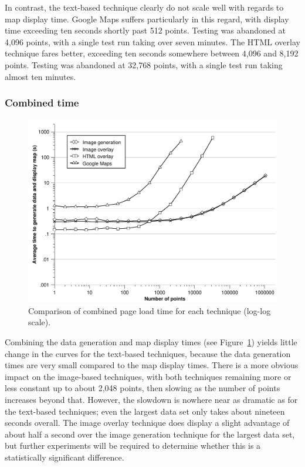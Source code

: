 \documentclass[acmnow]{acmtrans2m}
\begin{document}
In contrast, the text-based technique clearly do not scale well with
regards to map display time. Google Maps suffers particularly in this
regard, with display time exceeding ten seconds shortly past 512 points.
Testing was abandoned at 4,096 points, with a single test run taking
over seven minutes. The HTML overlay technique fares better, exceeding
ten seconds somewhere between 4,096 and 8,192 points. Testing was
abandoned at 32,768 points, with a single test run taking almost ten
minutes.


\subsubsection{Combined time}


\begin{figure}
	\centering
	\includegraphics[scale=0.5]{combined_time}
	\caption{Comparison of combined page load time for each technique (log-log scale).}
	\label{fig-combined-time}
\end{figure}


Combining the data generation and map display times (see
Figure~\ref{fig-combined-time}) yields little change in the curves for
the text-based techniques, because the data generation times are very
small compared to the map display times. There is a more obvious impact
on the image-based techniques, with both techniques remaining more or
less constant up to about 2,048 points, then slowing as the number of
points increases beyond that. However, the slowdown is nowhere near as
dramatic as for the text-based techniques; even the largest data set
only takes about nineteen seconds overall. The image overlay technique
does display a slight advantage of about half a second over the image
generation technique for the largest data set, but further experiments
will be required to determine whether this is a statistically
significant difference.
\end{document}
